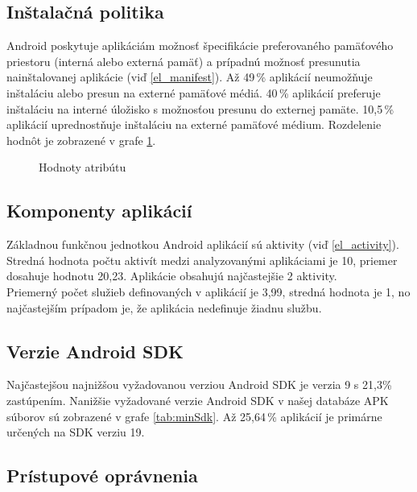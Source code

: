 \subsection*{Inštalačná politika}
Android poskytuje aplikáciám možnosť špecifikácie preferovaného pamäťového priestoru (interná alebo externá pamäť) a prípadnú možnosť presunutia nainštalovanej aplikácie (viď \ref{el_manifest}). Až 49\,\% aplikácií neumožňuje inštaláciu alebo presun na externé pamäťové médiá.  40\,\% aplikácií preferuje inštaláciu na interné úložisko s možnosťou presunu do externej pamäte. 10,5\,\% aplikácií uprednostňuje inštaláciu na externé pamäťové médium. Rozdelenie hodnôt je zobrazené v grafe \ref{fig:installLoc}.

\begin{figure}[!htbp]
\centering
{}
\label{fig:installLoc}
\caption{Hodnoty atribútu }
\end{figure}

\subsection*{Komponenty aplikácií}

Základnou funkčnou jednotkou Android aplikácií sú aktivity (viď \ref{el_activity}). Stredná hodnota počtu aktivít medzi analyzovanými aplikáciami je  10, priemer dosahuje hodnotu 20,23. Aplikácie obsahujú najčastejšie 2 aktivity.\\Priemerný počet služieb definovaných v aplikácií je 3,99, stredná hodnota je 1, no najčastejším prípadom je, že aplikácia nedefinuje žiadnu službu.

\subsection*{Verzie Android SDK}

Najčastejšou najnižšou vyžadovanou verziou Android SDK je verzia 9 s 21,3\% zastúpením. Nanižšie vyžadované verzie Android SDK v našej databáze APK súborov sú zobrazené v grafe \ref{tab:minSdk}. Až 25,64\,\% aplikácií je primárne určených na SDK verziu 19.

\subsection*{Prístupové oprávnenia}

